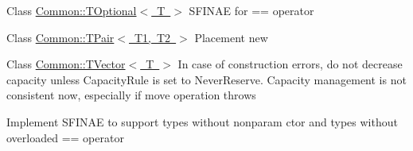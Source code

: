 
\begin{DoxyRefList}
\item[Class \mbox{\hyperlink{class_common_1_1_t_optional}{Common\+::TOptional$<$ T $>$}} ]\label{todo__todo000001}%
%
SFINAE for == operator  
\item[Class \mbox{\hyperlink{class_common_1_1_t_pair}{Common\+::TPair$<$ T1, T2 $>$}} ]\label{todo__todo000002}%
%
Placement new 
\item[Class \mbox{\hyperlink{class_common_1_1_t_vector}{Common\+::TVector$<$ T $>$}} ]\label{todo__todo000003}%
%
In case of construction errors, do not decrease capacity unless Capacity\+Rule is set to Never\+Reserve. Capacity management is not consistent now, especially if move operation throws

\label{todo__todo000004}%
%
Implement SFINAE to support types without nonparam ctor and types without overloaded == operator
\end{DoxyRefList}